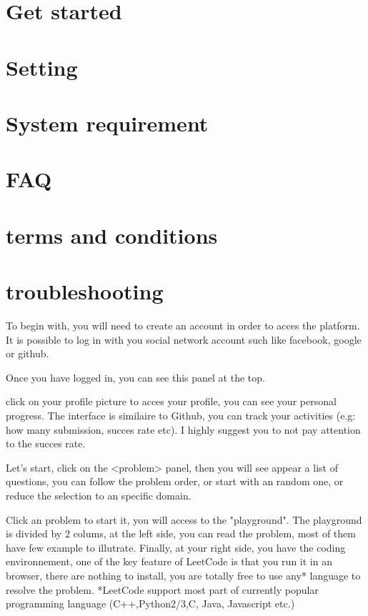 \documentclass[12pt, letterpaper]{article}
\begin{document}
\section{Get started}
\section{Setting}
\section{System requirement}
\section{FAQ}
\section{terms and conditions}
\section{troubleshooting}


To begin with, you will need to create an account in order to acces the platform. It is possible to log in with you social network account such like facebook, google or github.

Once you have logged in, you can see this panel at the top.

click on your profile picture to acces your profile, you can see your personal progress. The interface is similaire to Github, you can track your activities (e.g: how many submission, succes rate etc).
I highly suggest you to not pay attention to the succes rate.

Let's start,
click on the <problem> panel, then you will see appear a list of questions, you can follow the problem order, or start with an random one, or reduce the selection to an specific domain.

Click an problem to start it, you will access to the "playground".
The playground is divided by 2 colums, at the left side, you can read the problem, most of them have few example to illutrate. Finally, at your right side, you have the coding environnement, one of the key feature of LeetCode is that you run it in an browser, there are nothing to install, you are totally free to use any* language to resolve the problem.
*LeetCode support most part of currently popular programming language (C++,Python2/3,C, Java, Javascript etc.)
\end{document}
